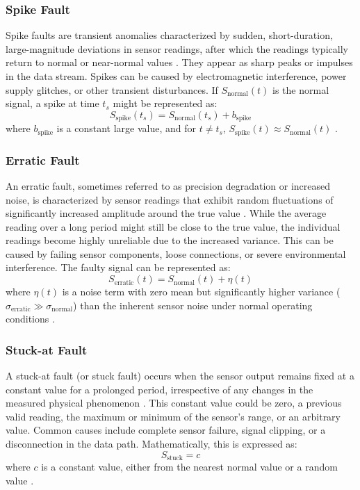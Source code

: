 \subsubsection{Spike Fault}
Spike faults are transient anomalies characterized by sudden, short-duration, large-magnitude deviations in sensor readings, after which the readings typically return to normal or near-normal values \cite{Saeed2021, Shi2024}. They appear as sharp peaks or impulses in the data stream. Spikes can be caused by electromagnetic interference, power supply glitches, or other transient disturbances. If \(S_\text{normal}(t)\) is the normal signal, a spike at time \(t_s\) might be represented as:
\[S_\text{spike}(t_s) = S_\text{normal}(t_s) + b_\text{spike}\]
where \(b_\text{spike}\) is a constant large value, and for \(t \neq t_s\), \(S_\text{spike}(t) \approx S_\text{normal}(t)\) \cite{Saeed2021, Shi2024}.

\subsubsection{Erratic Fault}
An erratic fault, sometimes referred to as precision degradation or increased noise, is characterized by sensor readings that exhibit random fluctuations of significantly increased amplitude around the true value \cite{Saeed2021}. While the average reading over a long period might still be close to the true value, the individual readings become highly unreliable due to the increased variance. This can be caused by failing sensor components, loose connections, or severe environmental interference. The faulty signal can be represented as:
\[S_\text{erratic}(t) = S_\text{normal}(t) + \eta(t)\]
where \(\eta(t)\) is a noise term with zero mean but significantly higher variance (\(\sigma_\text{erratic} \gg \sigma_\text{normal}\)) than the inherent sensor noise under normal operating conditions \cite{Saeed2021}.

\subsubsection{Stuck-at Fault}
A stuck-at fault (or stuck fault) occurs when the sensor output remains fixed at a constant value for a prolonged period, irrespective of any changes in the measured physical phenomenon \cite{Saeed2021, Hasan2024, Shi2024}. This constant value could be zero, a previous valid reading, the maximum or minimum of the sensor's range, or an arbitrary value. Common causes include complete sensor failure, signal clipping, or a disconnection in the data path. Mathematically, this is expressed as:
\[S_\text{stuck} = c\]
where \(c\) is a constant value, either from the nearest normal value or a random value \cite{Saeed2021, Hasan2024, Shi2024}.

